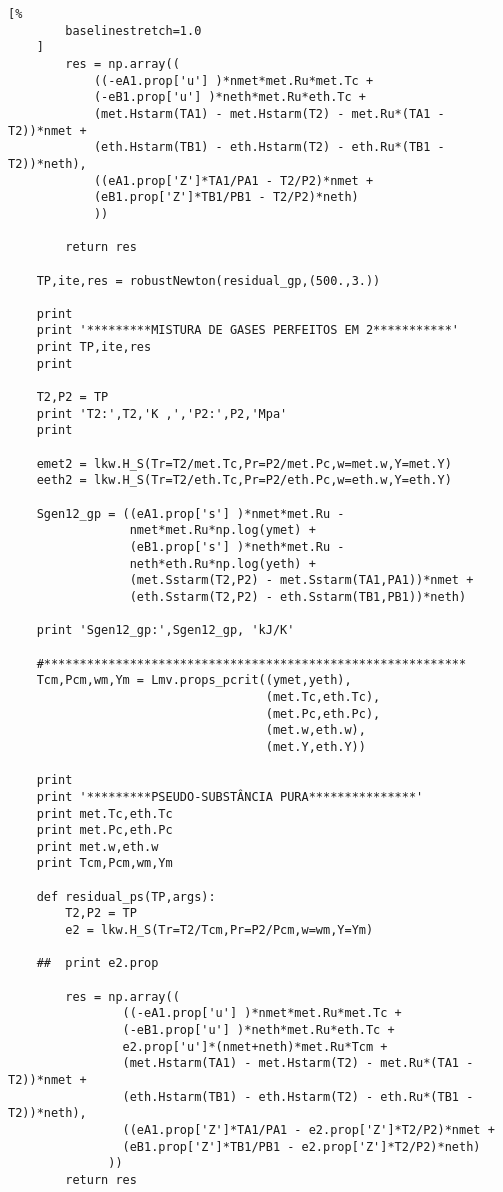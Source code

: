 \begin{Verbatim}[%
        baselinestretch=1.0
    ]
        res = np.array((
            ((-eA1.prop['u'] )*nmet*met.Ru*met.Tc +
            (-eB1.prop['u'] )*neth*met.Ru*eth.Tc +
            (met.Hstarm(TA1) - met.Hstarm(T2) - met.Ru*(TA1 - T2))*nmet +
            (eth.Hstarm(TB1) - eth.Hstarm(T2) - eth.Ru*(TB1 - T2))*neth),
            ((eA1.prop['Z']*TA1/PA1 - T2/P2)*nmet +
            (eB1.prop['Z']*TB1/PB1 - T2/P2)*neth)
            ))

        return res

    TP,ite,res = robustNewton(residual_gp,(500.,3.))

    print
    print '*********MISTURA DE GASES PERFEITOS EM 2***********'
    print TP,ite,res
    print

    T2,P2 = TP
    print 'T2:',T2,'K ,','P2:',P2,'Mpa'
    print

    emet2 = lkw.H_S(Tr=T2/met.Tc,Pr=P2/met.Pc,w=met.w,Y=met.Y)
    eeth2 = lkw.H_S(Tr=T2/eth.Tc,Pr=P2/eth.Pc,w=eth.w,Y=eth.Y)

    Sgen12_gp = ((eA1.prop['s'] )*nmet*met.Ru -
                 nmet*met.Ru*np.log(ymet) +
                 (eB1.prop['s'] )*neth*met.Ru -
                 neth*eth.Ru*np.log(yeth) +
                 (met.Sstarm(T2,P2) - met.Sstarm(TA1,PA1))*nmet +
                 (eth.Sstarm(T2,P2) - eth.Sstarm(TB1,PB1))*neth)

    print 'Sgen12_gp:',Sgen12_gp, 'kJ/K'

    #***********************************************************
    Tcm,Pcm,wm,Ym = Lmv.props_pcrit((ymet,yeth),
                                    (met.Tc,eth.Tc),
                                    (met.Pc,eth.Pc),
                                    (met.w,eth.w),
                                    (met.Y,eth.Y))

    print
    print '*********PSEUDO-SUBSTÂNCIA PURA***************'
    print met.Tc,eth.Tc
    print met.Pc,eth.Pc
    print met.w,eth.w
    print Tcm,Pcm,wm,Ym

    def residual_ps(TP,args):
        T2,P2 = TP
        e2 = lkw.H_S(Tr=T2/Tcm,Pr=P2/Pcm,w=wm,Y=Ym)

    ##  print e2.prop

        res = np.array((
                ((-eA1.prop['u'] )*nmet*met.Ru*met.Tc +
                (-eB1.prop['u'] )*neth*met.Ru*eth.Tc +
                e2.prop['u']*(nmet+neth)*met.Ru*Tcm +
                (met.Hstarm(TA1) - met.Hstarm(T2) - met.Ru*(TA1 - T2))*nmet +
                (eth.Hstarm(TB1) - eth.Hstarm(T2) - eth.Ru*(TB1 - T2))*neth),
                ((eA1.prop['Z']*TA1/PA1 - e2.prop['Z']*T2/P2)*nmet +
                (eB1.prop['Z']*TB1/PB1 - e2.prop['Z']*T2/P2)*neth)
              ))
        return res


\end{Verbatim}
